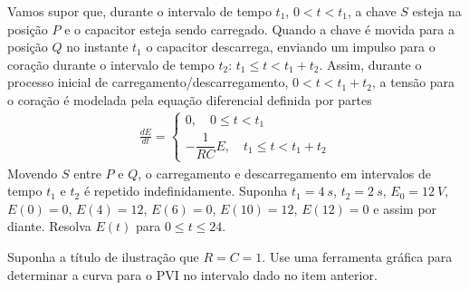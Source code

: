 \documentclass[oneside,12pt,a4paper]{report}
\begin{document}
    \begin{itensquestao}
        \item Vamos supor que, durante o intervalo de tempo $t_1$, $0<t<t_1$, a chave $S$ esteja na posição $P$ e o capacitor esteja sendo carregado. Quando a chave é movida para a posição $Q$ no instante $t_1$ o capacitor descarrega, enviando um impulso para o coração durante o intervalo de tempo $t_2$: $t_1\leq t<t_1+t_2$. Assim, durante o processo inicial de carregamento/descarregamento, $0<t<t_1+t_2$, a tensão para o coração é modelada pela equação diferencial definida por partes
        \begin{gather*}
            \frac{dE}{dt}=\begin{cases}
                0,\quad 0\leq t<t_1\\
                -\dfrac{1}{RC}E,\quad t_1\leq t<t_1+t_2
            \end{cases}
        \end{gather*}
        Movendo $S$ entre $P$ e $Q$, o carregamento e descarregamento em intervalos de tempo $t_1$ e $t_2$ é repetido indefinidamente. Suponha $t_1=4~s$, $t_2=2~s$, $E_0=12~V$, $E(0)=0$, $E(4)=12$, $E(6)=0$, $E(10)=12$, $E(12)=0$ e assim por diante. Resolva $E(t)$ para $0\leq t\leq24$.
        \item Suponha a título de ilustração que $R=C=1$. Use uma ferramenta gráfica para determinar a curva para o PVI no intervalo dado no item anterior.
    \end{itensquestao}
\end{document}
